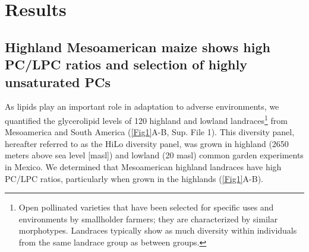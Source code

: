 \documentclass[9pt,twocolumn,twoside,lineno]{biorxiv}
\begin{document}
\section{Results}
\label{sec:results}
\subsection{Highland Mesoamerican maize shows high PC/LPC ratios and selection of highly unsaturated PCs}
As lipids play an important role in adaptation to adverse environments, we quantified the glycerolipid levels of 120 highland and lowland landraces\footnote[1]{Open pollinated varieties that have been selected for specific uses and environments by smallholder farmers; they are characterized by similar morphotypes. Landraces typically show as much diversity within individuals from the same landrace group as between groups.} from Mesoamerica and South America (\cref{Fig1}A-B, Sup. File 1). 
This  diversity panel, hereafter referred to as the HiLo diversity panel, was grown in highland (2650 meters above sea level [masl]) and lowland (20 masl) common garden experiments in Mexico.
We determined that Mesoamerican highland landraces have high PC/LPC ratios, particularly when grown in the highlands (\cref{Fig1}A-B).
\end{document}
